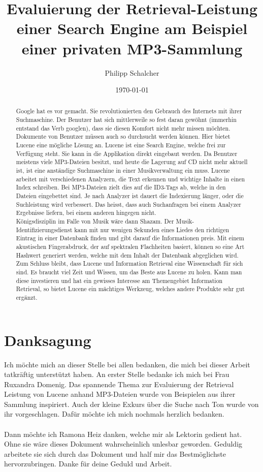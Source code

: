 \documentclass[12pt,a4paper,ngerman]{report}
\author{Philipp Schalcher}
\title{Evaluierung der Retrieval-Leistung einer Search Engine am Beispiel einer privaten MP3-Sammlung}
\date{\today}
\begin{document}

\chapter*{Danksagung}
Ich möchte mich an dieser Stelle bei allen bedanken, die mich bei dieser Arbeit tatkräftig
unterstützt haben.
An erster Stelle bedanke ich mich bei Frau Ruxandra Domenig. Das spannende Thema zur Evaluierung der Retrieval Leistung von Lucene anhand MP3-Dateien wurde von Beispielen aus ihrer Sammlung inspiriert. Auch der kleine Exkurs über die Suche nach Ton wurde von ihr vorgeschlagen. Dafür möchte ich mich nochmals herzlich bedanken.\\
\\
Dann möchte ich Ramona Heiz danken, welche mir als Lektorin gedient hat. Ohne sie wäre dieses Dokument wahrscheinlich unlesbar geworden. Geduldig arbeitete sie sich durch das Dokument und half mir das Bestmöglichste hervorzubringen. Danke für deine Geduld und Arbeit.
\tableofcontents
\begin{abstract}
Google hat es vor gemacht. Sie revolutionierten den Gebrauch des Internets mit ihrer Suchmaschine. Der Benutzer hat sich mittlerweile so fest daran gewöhnt (immerhin entstand das Verb googlen), dass sie diesen Komfort nicht mehr missen möchten.\\
Dokumente von Benutzer müssen auch so durchsucht werden können. Hier bietet Lucene eine mögliche Lösung an. Lucene ist eine Search Engine, welche frei zur Verfügung steht. Sie kann in die Applikation direkt eingebaut werden. Da Benutzer meistens viele MP3-Dateien besitzt, und heute die Lagerung auf CD nicht mehr aktuell ist, ist eine anständige Suchmaschine in einer Musikverwaltung ein muss. Lucene arbeitet mit verschiedenen Analyzern, die Text erkennen und wichtige Inhalte in einen Index schreiben. Bei MP3-Dateien zielt dies auf die ID3-Tags ab, welche in den Dateien eingebettet sind. Je nach Analyzer ist dauert die Indexierung länger, oder die Suchleistung wird verbessert. Das heisst, dass auch Suchanfragen bei einem Analyzer Ergebnisse liefern, bei einem anderen hingegen nicht.\\
Königsdisziplin im Falle von Musik wäre dann Shazam. Der Musik-Identifizierungsdienst kann mit nur wenigen Sekunden eines Liedes den richtigen Eintrag in einer Datenbank finden und gibt darauf die Informationen preis. Mit einem akustischen Fingerabdruck, der auf spektralen Flachheiten basiert, können so eine Art Hashwert generiert werden, welche mit dem Inhalt der Datenbank abgeglichen wird.\\
Zum Schluss bleibt, dass Lucene und Information Retrieval eine Wissenschaft für sich sind. Es braucht viel Zeit und Wissen, um das Beste aus Lucene zu holen. Kann man diese investieren und hat ein gewisses Interesse am Themengebiet Information Retrieval, so bietet Lucene ein mächtiges Werkzeug, welches andere Produkte sehr gut ergänzt.
\end{abstract}
\end{document}
